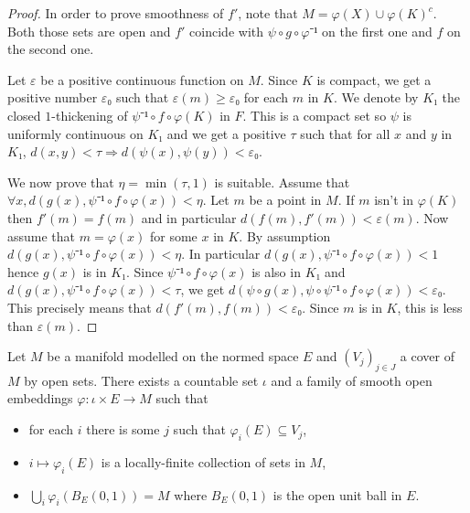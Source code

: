 \begin{proof}
  \leanok
  In order to prove smoothness of $f'$, note that $M = φ(X) ∪ φ(K)^c$. Both
  those sets are open and $f'$ coincide with $ψ ∘ g ∘ φ⁻¹$ on the first one and
  $f$ on the second one.

  Let $ε$ be a positive continuous function on $M$. Since $K$ is compact, we get
  a positive number $ε₀$ such that $ε(m) ≥ ε₀$ for each $m$ in $K$. We denote by
  $K₁$ the closed $1$-thickening of $ψ⁻¹∘f∘φ(K)$ in $F$. This is a compact set
  so $ψ$ is uniformly continuous on $K₁$ and we get a positive $τ$ such that
  for all $x$ and $y$ in $K₁$, $d(x, y) < τ ⇒ d(ψ(x), ψ(y)) < ε₀$.

  We now prove that $η = \min(τ, 1)$ is suitable. Assume that
  $∀ x, d(g(x), ψ⁻¹∘f∘φ(x)) < η$. Let $m$ be a point in $M$. If $m$ isn't in
  $φ(K)$ then $f'(m) = f(m)$ and in particular $d(f(m), f'(m)) < ε(m)$. Now
  assume that $m = φ(x)$ for some $x$ in $K$. By assumption $d(g(x), ψ⁻¹∘f∘φ(x)) < η$.
  In particular $d(g(x), ψ⁻¹∘f∘φ(x)) < 1$ hence $g(x)$ is in $K₁$. Since
  $ψ⁻¹∘f∘φ(x)$ is also in $K₁$ and $d(g(x), ψ⁻¹∘f∘φ(x)) < τ$, we get
  $d(ψ∘ g(x), ψ ∘ ψ⁻¹∘f∘φ(x)) < ε₀$. This precisely means that
  $d(f'(m), f(m)) < ε₀$. Since $m$ is in $K$, this is less than $ε(m)$.
\end{proof}

\begin{lemma}
  \label{lem:nice_atlas}
  \leanok
  Let $M$ be a manifold modelled on the normed space $E$ and $(V_j)_{j ∈ J}$
  a cover of $M$ by open sets. There exists a countable set $ι$ and
  a family of smooth open embeddings $φ : ι × E → M$ such that
  \begin{itemize}
    \item for each $i$ there is some $j$ such that $φ_i(E) \subseteq V_j$,
    \item $i ↦ φ_i(E)$ is a locally-finite collection of sets in $M$,
    \item $⋃_i φ_i(B_E(0, 1)) = M$ where $B_E(0, 1)$ is the open unit ball in $E$.
  \end{itemize}
\end{lemma}


